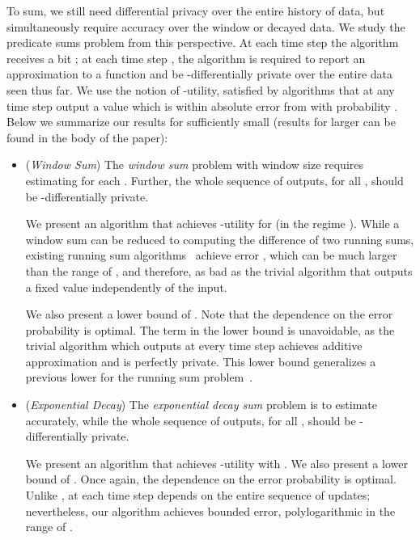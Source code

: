 {To sum, we still need differential privacy over the entire history of data, but simultaneously require accuracy over the window or decayed data.  
We study the predicate sums problem from this perspective.
}
At each time step  the algorithm receives a bit ; at each time
step , the algorithm is required to report an approximation
 to a function 
and be -differentially private over the entire data seen thus far. We use the notion of -utility, satisfied by algorithms that at any time step 
output a value  which is within 
absolute error from  with probability
. Below we summarize our results for sufficiently small  (results for larger  can be found in the body of the paper):
\begin{itemize}
  \setlength{\itemsep}{0.5pt}
  \setlength{\parskip}{0pt}
  \setlength{\parsep}{0pt}
\item ({\em Window Sum})
  The \emph{window sum} problem with window
  size  requires estimating  for each .  Further, the whole sequence  of
  outputs, for all , should be -differentially private.
  
  \smallskip
We present an algorithm that achieves -utility for
 (in the regime
 ). 
While a window sum can be reduced to computing the
difference of two running sums, existing running sum
algorithms~\cite{dwork-continual,chan2010private} achieve error
, which can be much
larger than the range  of , and therefore, as bad as the
trivial algorithm that outputs a fixed value independently of the input.

\smallskip
We also present a lower bound of . Note that the dependence on the error probability
 is optimal. The  term in the lower bound is unavoidable,
as the trivial algorithm which outputs  at every time step
achieves additive approximation  and is perfectly private. This
lower bound generalizes a previous lower for the running sum
problem~\cite{dwork-continual}. 

\smallskip
\item ({\em Exponential Decay}) The \emph{exponential decay sum}
  problem is to estimate  accurately, while the whole sequence  of
  outputs, for all , should be -differentially private.

\smallskip
  We present an algorithm that achieves -utility
  with   .  We also  present a lower bound of
  . Once again, the dependence
  on the error probability  is optimal. Unlike ,  at each time step
  depends on the entire sequence of updates; nevertheless, our
  algorithm achieves bounded error, polylogarithmic in the range of .


\end{itemize}
